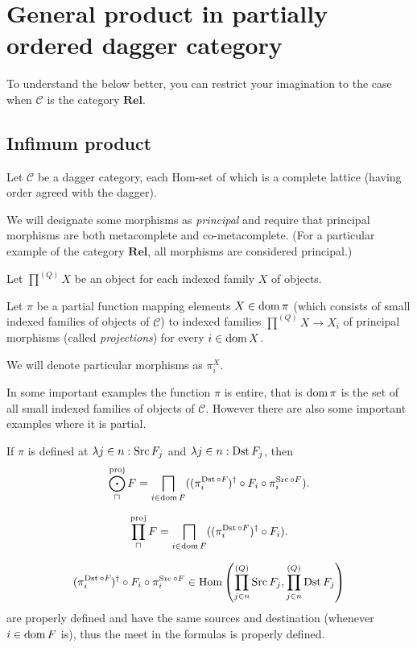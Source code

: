 \section{General product in partially ordered dagger category}

To understand the below better, you can restrict your imagination to the case
when $\mathcal{C}$ is the category $\mathbf{Rel}$.

\subsection{Infimum product}

Let $\mathcal{C}$ be a dagger category, each Hom-set of which is a complete
lattice (having order agreed with the dagger).

We will designate some morphisms as \emph{principal} and require that
principal morphisms are both metacomplete and co-metacomplete. (For a
particular example of the category $\mathbf{Rel}$, all morphisms are
considered principal.)

Let $\prod^{(Q)} X$ be an object for each indexed family $X$ of objects.

Let $\pi$ be a partial function mapping elements $X \in \operatorname{dom} \pi$ (which
consists of small indexed families of objects of $\mathcal{C}$) to indexed
families $\prod^{(Q)} X \rightarrow X_i$ of principal morphisms (called
\emph{projections}) for every $i \in \operatorname{dom} X$.

We will denote particular morphisms as $\pi^X_i$.

\begin{rem}
  In some important examples the function $\pi$ is entire, that is $\operatorname{dom}
  \pi$ is the set of all small indexed families of objects of $\mathcal{C}$.
  However there are also some important examples where it is partial.
\end{rem}

\begin{defn}
  If $\pi$ is defined at $\lambda
  j \in n : \operatorname{Src} F_j$ and $\lambda j \in n : \operatorname{Dst} F_j$, then
  \[ \bigodot^{\text{proj}}_{\sqcap} F = \bigsqcap_{i \in \operatorname{dom} F} ((\pi^{\operatorname{Dst} \circ
   F_{}}_i)^{\dagger} \circ F_i \circ \pi^{\operatorname{Src} \circ F}_i) . \]
\end{defn}

  \[ \prod^{\text{proj}}_{\sqcap} F = \bigsqcap_{i \in \operatorname{dom} F} ((\pi^{\operatorname{Dst}\circ F}_i)^{\dagger} \circ F_i) . \]

\begin{rem}
  \[ (\pi^{\operatorname{Dst} \circ
   F_{}}_i)^{\dagger} \circ F_i \circ \pi^{\operatorname{Src} \circ F}_i \in \operatorname{Hom} \left(
  \prod^{(Q)}_{j \in n} \operatorname{Src} F_j , \prod^{(Q)}_{j \in n} \operatorname{Dst} F_j
  \right) \] are properly defined and have the same sources and destination
  (whenever $i \in \operatorname{dom} F$ is), thus the meet in the formulas is
  properly defined.
\end{rem}

